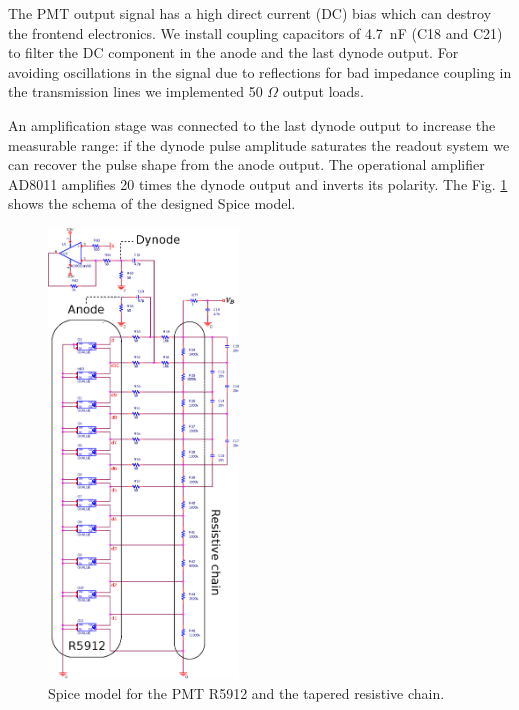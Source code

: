 \documentclass[letterpaper, 10 pt, conference]{ieeeconf}  %
\begin{document}
The PMT output signal has a high direct current (DC) bias which can destroy the frontend electronics. We install coupling capacitors of 4.7~nF (C18 and C21) to filter the DC component in the anode and the last dynode output. For avoiding oscillations in the signal due to reflections for bad impedance coupling in the transmission lines we implemented 50 $\Omega$ output loads. 

An amplification stage was connected to the last dynode output to increase the measurable range: if the dynode pulse amplitude saturates the readout system we can recover the pulse shape from the anode output. The operational amplifier AD8011 amplifies 20 times the dynode output and inverts its polarity. The Fig. \ref{Circuit} shows the schema of the designed Spice model.


\begin{figure}[h!]
\begin{center}
\includegraphics[width=0.45\textwidth]{Figures/Circuit}
\caption{Spice model for the PMT R5912 and the tapered resistive chain.}
\label{Circuit}
\end{center}
\end{figure}
\end{document}
